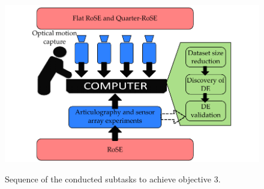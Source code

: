 \begin{figure}[bth]
	\myfloatalign
	{\includegraphics[width=\linewidth]{images/Ch1/fig4_Obj3}} \quad
	\caption[Sequence of the conducted subtasks to achieve objective 3.]{Sequence of the conducted subtasks to achieve objective 3.}\label{fig4_Obj3}
\end{figure}

